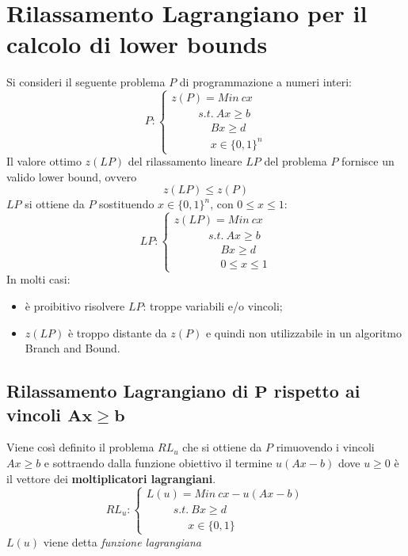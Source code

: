 \chapter{Rilassamento Lagrangiano per il calcolo di lower bounds}
Si consideri il seguente problema $P$ di programmazione a numeri interi:
\begin{displaymath}
P:
\begin{cases}
	z(P)=Min\ cx \\
	\ \ \ \ \ \ \ \ \ \ \ s.t.\ Ax\ge b \\
	\ \ \ \ \ \ \ \ \ \ \ \ \ \ \ \ Bx\ge d \\
	\ \ \ \ \ \ \ \ \ \ \ \ \ \ \ \ x\in\{0,1\}^{n} 
\end{cases}
\end{displaymath}
Il valore ottimo $z(LP)$ del rilassamento lineare $LP$ del problema $P$ fornisce un valido lower bound, ovvero
\begin{equation*}
	z(LP)\le z(P)
\end{equation*}
$LP$ si ottiene da $P$ sostituendo $x\in\{0,1\}^{n}$, con $0\le x\le 1$:
\begin{displaymath}
LP:
\begin{cases}
z(LP)=Min\ cx \\
\ \ \ \ \ \ \ \ \ \ \ \ \ \ s.t.\ Ax\ge b \\
\ \ \ \ \ \ \ \ \ \ \ \ \ \ \ \ \ \ \ Bx\ge d \\
\ \ \ \ \ \ \ \ \ \ \ \ \ \ \ \ \ \ \ 0\le x\le 1
\end{cases}
\end{displaymath}
In molti casi:
\begin{itemize}
	\item è proibitivo risolvere $LP$: troppe variabili e/o vincoli;
	\item $z(LP)$ è troppo distante da $z(P)$ e quindi non utilizzabile in un algoritmo Branch and Bound.
\end{itemize}

\section{Rilassamento Lagrangiano di $\boldsymbol{P}$ rispetto ai vincoli $\boldsymbol{Ax\ge b}$}
Viene così definito il problema $RL_{u}$ che si ottiene da $P$ rimuovendo i vincoli $Ax\ge b$ e sottraendo dalla funzione obiettivo il termine $u(Ax-b)$ dove $u\ge 0$ è il vettore dei \textbf{moltiplicatori lagrangiani}.
\begin{displaymath}
	RL_{u}:
	\begin{cases}
		L(u)=Min\ cx-u(Ax-b) \\
		\ \ \ \ \ \ \ \ \ \ \ s.t.\ Bx\ge d \\
		\ \ \ \ \ \ \ \ \ \ \ \ \ \ \ \ \ x\in\{0,1\}
	\end{cases}
\end{displaymath}
$L(u)$ viene detta \textit{funzione lagrangiana}

